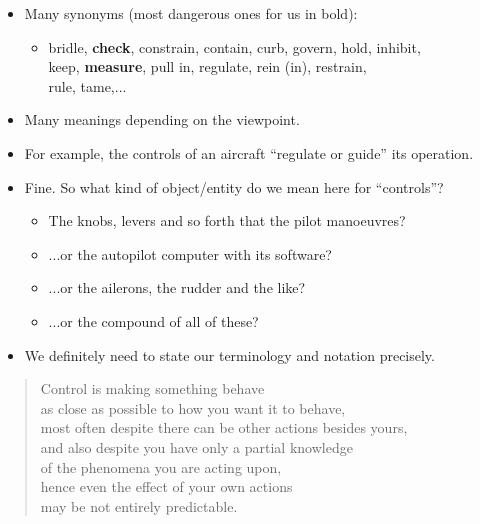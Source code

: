 \begin{frame}
\myPause
\begin{itemize}[<+-| alert@+>]
\item Many synonyms (most dangerous ones for us in bold):
      \begin{itemize}
      \item[] bridle, \textbf{check}, constrain, contain, curb, govern, hold, inhibit, \\
              keep, \textbf{measure}, pull in, regulate, rein (in), restrain,\\
              rule, tame,...
      \end{itemize}
\item Many meanings depending on the viewpoint.
\item[] \vspace{-1.5mm}For example, the controls of an aircraft ``regulate or guide'' its operation.
\item[] \vspace{-0.75mm}Fine. So what kind of object/entity do we mean here for ``controls''?
      \begin{itemize}
      \item The knobs, levers and so forth that the pilot manoeuvres?
      \item ...or the autopilot computer with its software?
      \item ...or the ailerons, the rudder and the like?
      \item ...or the compound of all of these?
      \end{itemize}
      \myPause
\item \vfill We definitely need to state our terminology and notation precisely.
\end{itemize}
\end{frame}


\begin{frame}
\myPause
\begin{quote}
 \begin{center}
  \Large{Control is making something behave\\
         as close as possible to how you want it to behave,\\ \myPause
         most often despite there can be other actions besides yours,\\ \myPause
         and also despite you have only a partial knowledge\\
         of the phenomena you are acting upon, \\ \myPause
         hence even the effect of your own actions\\
         may be not entirely predictable.}
 \end{center}
\end{quote}
\end{frame}

